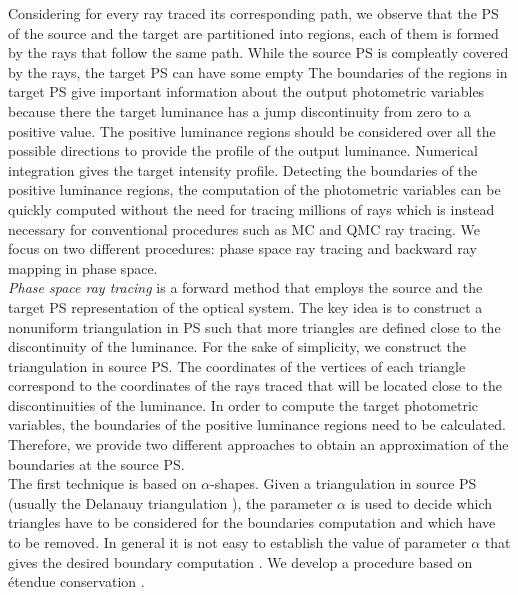 Considering for every ray traced its corresponding path, we observe that the PS of the source and the target are partitioned into regions, each of them is formed by the rays that follow the same path. 
While the source PS is compleatly covered by the rays, the target PS can have some empty  The boundaries of the regions in target PS give important information about the output photometric variables because there the target luminance has a jump discontinuity from zero to a positive value. 
The positive luminance regions should be considered over all the possible directions to provide the profile of the output luminance. 
Numerical integration gives the target intensity profile. Detecting the boundaries of the positive luminance regions, the computation of the photometric variables can be quickly computed without the need for tracing millions of rays which is instead necessary for conventional procedures such as MC and QMC ray tracing. We focus on two different procedures: phase space ray tracing and backward ray mapping in phase space. \\ \indent
\textit{Phase space ray tracing} is a forward method that employs the source and the target PS representation of the optical system. The key idea is to construct a nonuniform triangulation in PS such that more triangles are defined close to the discontinuity of the luminance. For the sake of simplicity, we construct the triangulation in source PS. The coordinates of the vertices of each triangle correspond to the coordinates of the rays traced that will be located close to the discontinuities of the luminance. In order to compute the target photometric variables, the boundaries of the positive luminance regions need to be calculated. 
Therefore, we provide two different approaches to obtain an approximation of the boundaries at the source PS.  \\ \indent
The first technique is based on $\alpha$-shapes. 
Given a triangulation in source PS (usually the Delanauy triangulation \cite{marsden2003texts}), the parameter $\alpha$ is used to decide which triangles have to be considered for the boundaries computation and which have to be removed. In general it is not easy to establish the value of parameter $\alpha$ that gives the desired boundary computation \cite{teichmann1998surface}. We develop a procedure based on \'{e}tendue conservation \cite{filosa2015new}. 
